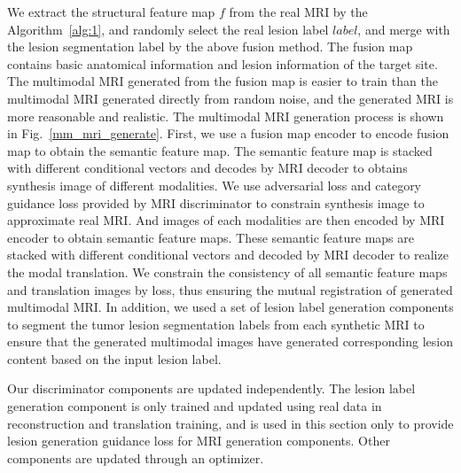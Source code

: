 \documentclass[letterpaper]{article} %
\begin{document}
We extract the structural feature map $f$ from the real MRI by the Algorithm~\ref{alg:1}, and randomly select the real lesion label $label$, and merge with the lesion segmentation label by the above fusion method. The fusion map contains basic anatomical information and lesion information of the target site. The multimodal MRI generated from the fusion map is easier to train than the multimodal MRI generated directly from random noise, and the generated MRI is more reasonable and realistic. The multimodal MRI generation process is shown in Fig.~\ref{mm_mri_generate}. First, we use a fusion map encoder to encode fusion map to obtain the semantic feature map. The semantic feature map is stacked with different conditional vectors and decodes by MRI decoder to obtains synthesis image of different modalities. We use adversarial loss and category guidance loss provided by MRI discriminator to constrain synthesis image to approximate real MRI. And images of each modalities are then encoded by MRI encoder to obtain semantic feature maps. These semantic feature maps are stacked with different conditional vectors and decoded by MRI decoder to realize the modal translation. We constrain the consistency of all semantic feature maps and translation images by loss, thus ensuring the mutual registration of generated multimodal MRI. In addition, we used a set of lesion label generation components to segment the tumor lesion segmentation labels from each synthetic MRI to ensure that the generated multimodal images have generated corresponding lesion content based on the input lesion label.

Our discriminator components are updated independently. The lesion label generation component is only trained and updated using real data in reconstruction and translation training, and is used in this section only to provide lesion generation guidance loss for MRI generation components. Other components are updated through an optimizer.
\end{document}
